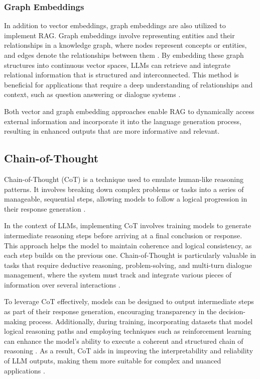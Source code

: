 \subsubsection{Graph Embeddings}
In addition to vector embeddings, graph embeddings are also utilized to implement RAG. Graph embeddings involve representing entities and their relationships in a knowledge graph, where nodes represent concepts or entities, and edges denote the relationships between them \cite{velickovicGraphAttentionNetworks2018}. By embedding these graph structures into continuous vector spaces, LLMs can retrieve and integrate relational information that is structured and interconnected. This method is beneficial for applications that require a deep understanding of relationships and context, such as question answering or dialogue systems \cite{edgeLocalGlobalGraph2024}.

Both vector and graph embedding approaches enable RAG to dynamically access external information and incorporate it into the language generation process, resulting in enhanced outputs that are more informative and relevant.

\subsection{Chain-of-Thought}

Chain-of-Thought (CoT) is a technique used to emulate human-like reasoning patterns. It involves breaking down complex problems or tasks into a series of manageable, sequential steps, allowing models to follow a logical progression in their response generation \cite{weiChainofThoughtPromptingElicits2023}.

In the context of LLMs, implementing CoT involves training models to generate intermediate reasoning steps before arriving at a final conclusion or response. This approach helps the model to maintain coherence and logical consistency, as each step builds on the previous one. Chain-of-Thought is particularly valuable in tasks that require deductive reasoning, problem-solving, and multi-turn dialogue management, where the system must track and integrate various pieces of information over several interactions \cite{weiChainofThoughtPromptingElicits2023, huangReasoningLargeLanguage2023}.

To leverage CoT effectively, models can be designed to output intermediate steps as part of their response generation, encouraging transparency in the decision-making process. Additionally, during training, incorporating datasets that model logical reasoning paths and employing techniques such as reinforcement learning can enhance the model's ability to execute a coherent and structured chain of reasoning \cite{weiChainofThoughtPromptingElicits2023}. As a result, CoT aids in improving the interpretability and reliability of LLM outputs, making them more suitable for complex and nuanced applications \cite{huangReasoningLargeLanguage2023}.

